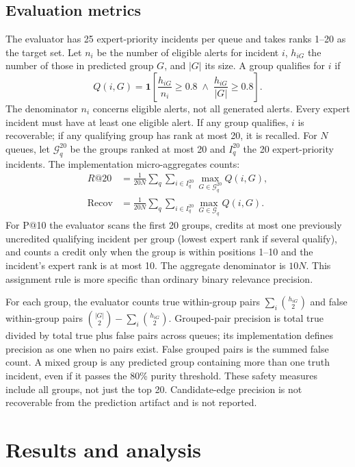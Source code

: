 \documentclass[pdflatex,sn-mathphys-num,iicol]{sn-jnl}
\begin{document}
\subsection{Evaluation metrics}
The evaluator has 25 expert-priority incidents per queue and takes ranks 1--20 as the target set. Let $n_i$ be the number of eligible alerts for incident $i$, $h_{iG}$ the number of those in predicted group $G$, and $|G|$ its size. A group qualifies for $i$ if
\begin{equation}\label{eq:qualify}Q(i,G)=\mathbf{1}\left[\frac{h_{iG}}{n_i}\geq0.8\;\land\;\frac{h_{iG}}{|G|}\geq0.8\right].\end{equation}
The denominator $n_i$ concerns eligible alerts, not all generated alerts. Every expert incident must have at least one eligible alert. If any group qualifies, $i$ is recoverable; if any qualifying group has rank at most 20, it is recalled. For $N$ queues, let $\mathcal G_q^{20}$ be the groups ranked at most 20 and $I_q^{20}$ the 20 expert-priority incidents. The implementation micro-aggregates counts:
\begin{align}\label{eq:recall}
R@20&=\frac{1}{20N}\sum_q\sum_{i\in I_q^{20}}
\max_{G\in\mathcal G_q^{20}} Q(i,G),\\
\operatorname{Recov}&=\frac{1}{20N}\sum_q\sum_{i\in I_q^{20}}
\max_{G\in\mathcal G_q} Q(i,G).
\end{align}
For P@10 the evaluator scans the first 20 groups, credits at most one previously uncredited qualifying incident per group (lowest expert rank if several qualify), and counts a credit only when the group is within positions 1--10 and the incident's expert rank is at most 10. The aggregate denominator is $10N$. This assignment rule is more specific than ordinary binary relevance precision.

For each group, the evaluator counts true within-group pairs $\sum_i\binom{h_{iG}}2$ and false within-group pairs $\binom{|G|}2-\sum_i\binom{h_{iG}}2$. Grouped-pair precision is total true divided by total true plus false pairs across queues; its implementation defines precision as one when no pairs exist. False grouped pairs is the summed false count. A mixed group is any predicted group containing more than one truth incident, even if it passes the 80\% purity threshold. These safety measures include all groups, not just the top 20. Candidate-edge precision is not recoverable from the prediction artifact and is not reported.


\section{Results and analysis}
\end{document}
